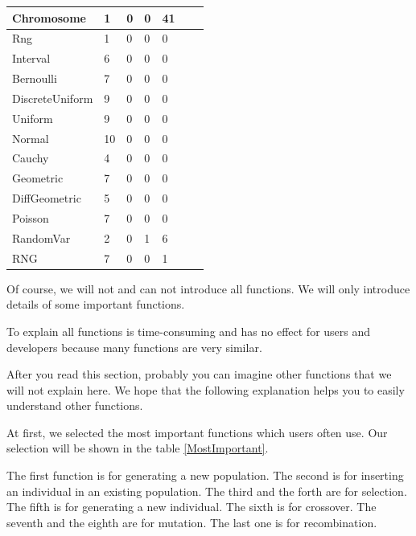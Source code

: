\documentclass[twocolumn]{article}
\begin{document}
\begin{table}[h]
\begin{center}
{\begin{tabular}{|l|l|l|l|l|l|l|}
Chromosome                 &      1 &       0 &       0 &      41 \\\hline
Rng                        &      1 &       0 &       0 &       0 \\\hline
Interval                   &      6 &       0 &       0 &       0 \\\hline
Bernoulli                  &      7 &       0 &       0 &       0 \\\hline
DiscreteUniform            &      9 &       0 &       0 &       0 \\\hline
Uniform                    &      9 &       0 &       0 &       0 \\\hline
Normal                     &     10 &       0 &       0 &       0 \\\hline
Cauchy                     &      4 &       0 &       0 &       0 \\\hline
Geometric                  &      7 &       0 &       0 &       0 \\\hline
DiffGeometric              &      5 &       0 &       0 &       0 \\\hline
Poisson                    &      7 &       0 &       0 &       0 \\\hline
RandomVar                  &      2 &       0 &       1 &       6 \\\hline
RNG                        &      7 &       0 &       0 &       1 \\\hline
\end{tabular}
}
\end{center}
\end{table}

\noindent
Of course, we will not and can not introduce all functions. We will only
introduce details of some important functions. 

\noindent
To explain all functions is time-consuming and has no effect for users
and developers because many functions are very similar. 

\noindent
After you read this section, probably you can imagine other functions
that we will not explain here. We hope that the following explanation
helps you to easily understand other functions.

\noindent
At first, we selected the most important functions which users often
use. Our selection will be shown in the table \ref{MostImportant}.

\noindent
The first function is for generating a new population. The second is
for inserting an individual in an existing population. The third and
the forth are for selection. The fifth is for generating a new
individual. The sixth is for crossover. The seventh and the eighth are
for mutation. The last one is for recombination.
\end{document}
